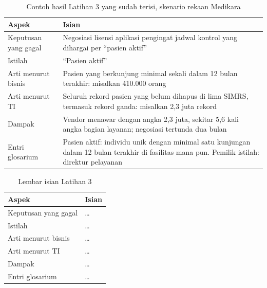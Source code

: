 \begin{table}[!htb]
  \centering
  \caption{Contoh hasil Latihan 3 yang sudah terisi, skenario rekaan Medikara}
  \label{tab:ch01-lat3-contoh}
  \footnotesize
  \begin{tabularx}{\textwidth}{>{\raggedright\arraybackslash}p{2.8cm}
      >{\raggedright\arraybackslash}X}
    \hline
    \textbf{Aspek} & \textbf{Isian} \\
    \hline
    Keputusan yang gagal & Negosiasi lisensi aplikasi pengingat jadwal kontrol yang dihargai per ``pasien aktif'' \\
    \hline
    Istilah & ``Pasien aktif'' \\
    \hline
    Arti menurut bisnis & Pasien yang berkunjung minimal sekali dalam 12 bulan terakhir: misalkan 410.000 orang \\
    \hline
    Arti menurut TI & Seluruh rekord pasien yang belum dihapus di lima SIMRS, termasuk rekord ganda: misalkan 2,3 juta rekord \\
    \hline
    Dampak & Vendor menawar dengan angka 2,3 juta, sekitar 5,6 kali angka bagian layanan; negosiasi tertunda dua bulan \\
    \hline
    Entri glosarium & Pasien aktif: individu unik dengan minimal satu kunjungan dalam 12 bulan terakhir di fasilitas mana pun. Pemilik istilah: direktur pelayanan \\
    \hline
  \end{tabularx}
\end{table}

\begin{table}[!htb]
  \centering
  \caption{Lembar isian Latihan 3}
  \label{tab:ch01-lat3-hasil}
  \footnotesize
  \begin{tabularx}{\textwidth}{>{\raggedright\arraybackslash}p{2.8cm}
      >{\raggedright\arraybackslash}X}
    \hline
    \textbf{Aspek} & \textbf{Isian} \\
    \hline
    Keputusan yang gagal & \dots \\
    \hline
    Istilah & \dots \\
    \hline
    Arti menurut bisnis & \dots \\
    \hline
    Arti menurut TI & \dots \\
    \hline
    Dampak & \dots \\
    \hline
    Entri glosarium & \dots \\
    \hline
  \end{tabularx}
\end{table}
